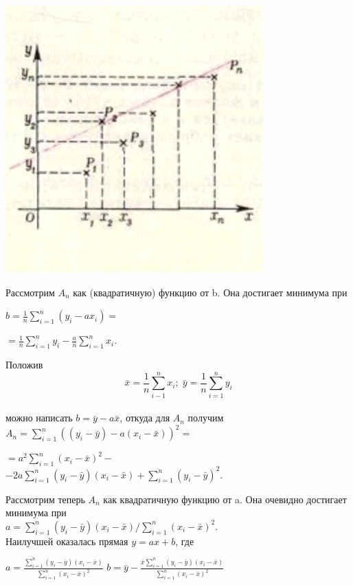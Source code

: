 \begin{multicols}{2}
        \begin{flushleft}
        
	    \includegraphics[scale=0.5]{Рисунок 1.PNG} %
	    \end{flushleft}


	    Рассмотрим $A_n$ как (квадратичную) функцию от b. Она достигает минимума при 
	    \begin{flushleft}
	    $b = \frac{1}{n}\sum\limits_{i=1}^n (y_i - ax_i) =$
	    \end{flushleft}
	    \begin{flushright}
	    $=\frac{1}{n}\sum\limits_{i=1}^n y_i - \frac{a}{n}\sum\limits_{i=1}^n x_i .$
	    \end{flushright}
	    Положив 
	    $$\bar x  = \frac{1}{n}\sum\limits_{i-1}^n x_i ;\; \bar y = \frac{1}{n}\sum\limits_{i=1}^n y_i$$\\ %
	    можно написать $b = \bar y - a\bar x$, откуда для $A_n$ получим\\
	    $A_n = \sum\limits_{i=1}^n ((y_i - \bar y) - a(x_i - \bar x))^2 =$
	    \begin{center}
	    $=a^2\sum\limits_{i=1}^n (x_i - \bar x)^2 -$\\
	    $-2a \sum\limits_{i=1}^n (y_i - \bar y) (x_i - \bar x) + \sum\limits_{i=1}^n (y_i - \bar y)^2 .$
	    \end{center}
	    Рассмотрим теперь $A_n$ как квадратичную функцию от a. Она очевидно достигает минимума при \\ 
	    $a = \sum\limits_{i=1}^n (y_i - \bar y)(x_i - \bar x) \bigg/ \sum\limits_{i=1}^n (x_i - \bar x)^2 .$\\ 
	    Наилучшей оказалась прямая $y=ax+b$, где 
	    \begin{center}
	    $a=\frac{ \sum\limits_{i=1}^n (y_i - \bar y)(x_i - \bar x)}{\sum\limits_{i=1}^n (x_i - \bar x)^2}$
	    $b = \bar y - \frac{ \bar x \sum\limits_{i=1}^n (y_i - \bar y)(x_i - \bar x)}{\sum\limits_{i=1}^n (x_i - \bar x)^2}$
	    \end{center}
	    

\end{multicols}
